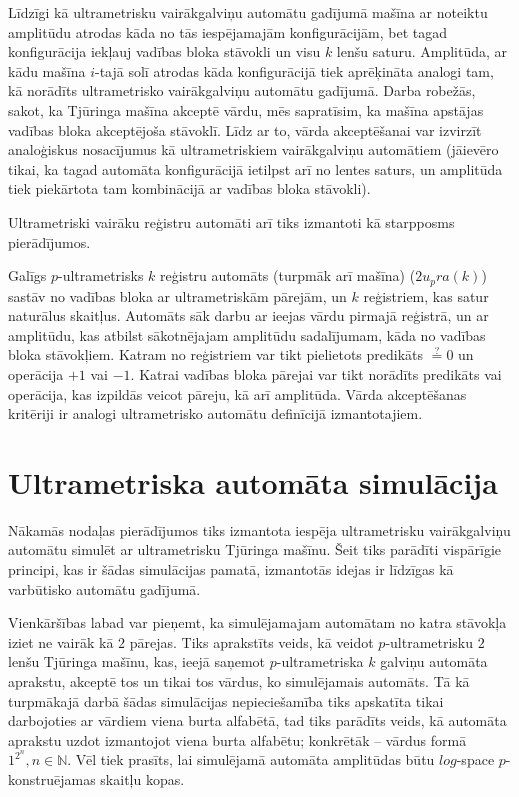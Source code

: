 \documentclass{ludis}
\begin{document}
Līdzīgi kā ultrametrisku vairākgalviņu automātu gadījumā mašīna ar noteiktu amplitūdu atrodas kāda no tās iespējamajām konfigurācijām, bet tagad konfigurācija iekļauj vadības bloka stāvokli un visu $k$ lenšu saturu. Amplitūda, ar kādu mašīna $i$-tajā solī atrodas kāda konfigurācijā tiek aprēķināta analogi tam, kā norādīts ultrametrisko vairākgalviņu automātu gadījumā. Darba robežās, sakot, ka Tjūringa mašīna akceptē vārdu, mēs sapratīsim, ka mašīna apstājas vadības bloka akceptējoša stāvoklī. Līdz ar to, vārda akceptēšanai var izvirzīt analoģiskus nosacījumus kā ultrametriskiem vairākgalviņu automātiem (jāievēro tikai, ka tagad automāta konfigurācijā ietilpst arī no lentes saturs, un amplitūda tiek piekārtota tam kombinācijā ar vadības bloka stāvokli).

Ultrametriski vairāku reģistru automāti arī tiks izmantoti kā starpposms pierādījumos.
\begin{definicija}
Galīgs $p$-ultrametrisks $k$ reģistru automāts (turpmāk arī mašīna) ($2u_pra(k)$) sastāv no vadības bloka ar ultrametriskām pārejām, un $k$ reģistriem, kas satur naturālus skaitļus. Automāts sāk darbu ar ieejas vārdu pirmajā reģistrā, un ar amplitūdu, kas atbilst sākotnējajam amplitūdu sadalījumam, kāda no vadības bloka stāvokļiem. Katram no reģistriem var tikt pielietots predikāts $\stackrel{?}{=} 0$ un operācija $+1$ vai $-1$. Katrai vadības bloka pārejai var tikt norādīts predikāts vai operācija, kas izpildās veicot pāreju, kā arī amplitūda. Vārda akceptēšanas kritēriji ir analogi ultrametrisko automātu definīcijā izmantotajiem.
\end{definicija}

\section{Ultrametriska automāta simulācija}
Nākamās nodaļas pierādījumos tiks izmantota iespēja ultrametrisku vairākgalviņu automātu simulēt ar ultrametrisku Tjūringa mašīnu. Šeit tiks parādīti vispārīgie principi, kas ir šādas simulācijas pamatā, izmantotās idejas ir līdzīgas kā ~\citep{Macarie1995} varbūtisko automātu gadījumā.

Vienkāršības labad var pieņemt, ka simulējamajam automātam no katra stāvokļa iziet ne vairāk kā $2$ pārejas. Tiks aprakstīts veids, kā veidot $p$-ultrametrisku $2$ lenšu Tjūringa mašīnu, kas, ieejā saņemot $p$-ultrametriska $k$ galviņu automāta aprakstu, akceptē tos un tikai tos vārdus, ko simulējamais automāts. Tā kā turpmākajā darbā šādas simulācijas nepieciešamība tiks apskatīta tikai darbojoties ar vārdiem viena burta alfabētā, tad tiks parādīts veids, kā automāta aprakstu uzdot izmantojot viena burta alfabētu; konkrētāk -- vārdus formā $1^{2^n}, n \in \mathbb{N}$. Vēl tiek prasīts, lai simulējamā automāta amplitūdas būtu $log$-space $p$-konstruējamas skaitļu kopas.
\end{document}
